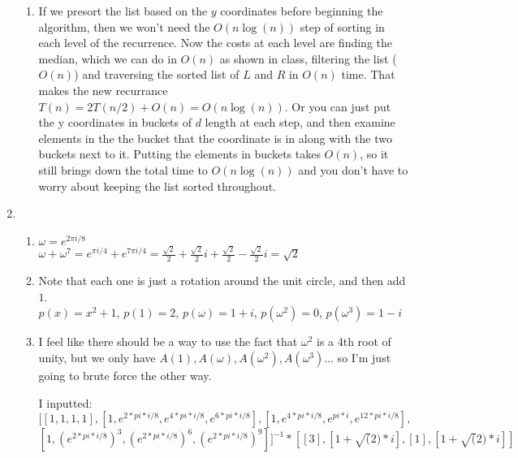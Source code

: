 \documentclass[11pt]{article}
\begin{document}
\begin{enumerate}
\begin{enumerate}
\item If we presort the list based on the $y$ coordinates before beginning the algorithm, then we won't need the $O(n\log(n))$ step of sorting in each level of the recurrence. Now the costs at each level are finding the median, which we can do in $O(n)$ as shown in class, filtering the list ($O(n)$) and traversing the sorted list of $L$ and $R$ in $O(n)$ time. That makes the new recurrance $T(n)=2T(n/2)+O(n)=O(n\log(n))$. Or you can just put the y coordinates in buckets of $d$ length at each step, and then examine elements in the the bucket that the coordinate is in along with the two buckets next to it. Putting the elements in buckets takes $O(n)$, so it still brings down the total time to $O(n\log(n))$ and you don't have to worry about keeping the list sorted throughout.
\end{enumerate}
\newpage
\item
\begin{enumerate}
\item $\omega = e^{2\pi i/8}$\\
$\omega + \omega^7 = e^{\pi i/4}+e^{7\pi i/4}=\frac{\sqrt{2}}{2}+\frac{\sqrt{2}}{2}i+\frac{\sqrt{2}}{2}-\frac{\sqrt{2}}{2}i=\sqrt{2}$
\item Note that each one is just a rotation around the unit circle, and then add $1$.\\$p(x)=x^2+1$, $p(1)=2$, $p(\omega)=1+i$, $p(\omega^2)=0$, $p(\omega^3)=1-i$
\item I feel like there should be a way to use the fact that $\omega^2$ is a 4th root of unity, but we only have $A(1),A(\omega),A(\omega^2),A(\omega^3)$... so I'm just going to brute force the other way.

I inputted: \\
$[[1,1,1,1],[1,e^{2*pi*i/8},e^{4*pi*i/8},e^{6*pi*i/8}],[1,e^{4*pi*i/8},e^{pi*i},e^{12*pi*i/8}],$\\
$[1,(e^{2*pi*i/8})^3,(e^{2*pi*i/8})^6,(e^{2*pi*i/8})^9]]^{-1} * [[3],[1+\sqrt(2)*i],[1],[1+\sqrt(2)*i]]$


\end{enumerate}
\end{enumerate}
\end{document}
